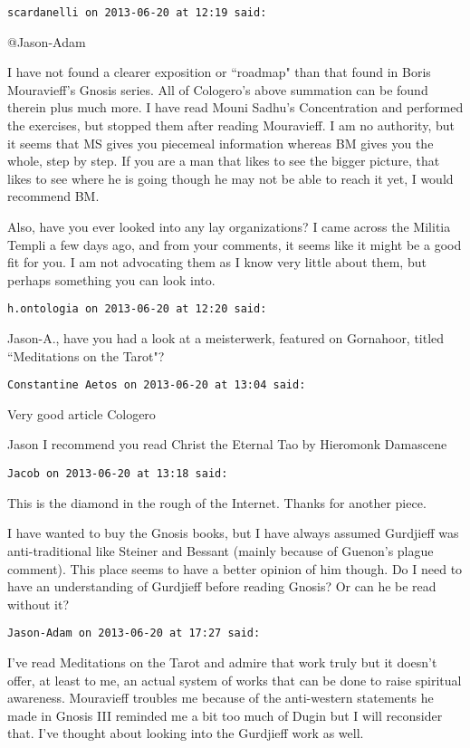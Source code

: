 \begin{footnotesize}
\begin{sffamily}
\hfill

\texttt{scardanelli on 2013-06-20 at 12:19 said: }

@Jason-Adam

I have not found a clearer exposition or ``roadmap" than that found in Boris Mouravieff's Gnosis series. All of Cologero's above summation can be found therein plus much more. I have read Mouni Sadhu's Concentration and performed the exercises, but stopped them after reading Mouravieff. I am no authority, but it seems that MS gives you piecemeal information whereas BM gives you the whole, step by step. If you are a man that likes to see the bigger picture, that likes to see where he is going though he may not be able to reach it yet, I would recommend BM.

Also, have you ever looked into any lay organizations? I came across the Militia Templi a few days ago, and from your comments, it seems like it might be a good fit for you. I am not advocating them as I know very little about them, but perhaps something you can look into.


\hfill

\texttt{h.ontologia on 2013-06-20 at 12:20 said: }

Jason-A., have you had a look at a meisterwerk, featured on Gornahoor, titled ``Meditations on the Tarot"?


\hfill

\texttt{Constantine Aetos on 2013-06-20 at 13:04 said: }

Very good article Cologero 

Jason I recommend you read Christ the Eternal Tao by Hieromonk Damascene


\hfill

\texttt{Jacob on 2013-06-20 at 13:18 said: }

This is the diamond in the rough of the Internet. Thanks for another piece. 

I have wanted to buy the Gnosis books, but I have always assumed Gurdjieff was anti-traditional like Steiner and Bessant (mainly because of Guenon's plague comment). This place seems to have a better opinion of him though. Do I need to have an understanding of Gurdjieff before reading Gnosis? Or can he be read without it?


\hfill

\texttt{Jason-Adam on 2013-06-20 at 17:27 said: }

I've read Meditations on the Tarot and admire that work truly but it doesn't offer, at least to me, an actual system of works that can be done to raise spiritual awareness. Mouravieff troubles me because of the anti-western statements he made in Gnosis III reminded me a bit too much of Dugin but I will reconsider that. I've thought about looking into the Gurdjieff work as well.



\end{sffamily}
\end{footnotesize}

